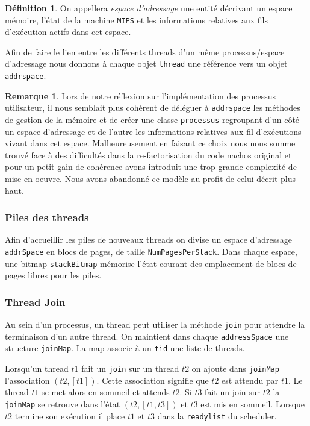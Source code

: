 \documentclass[11pt]{article}
\theoremstyle{definition}
\newtheorem*{myRem}{Remarque}
\theoremstyle{definition}
\newtheorem*{myDef}{Définition}
\begin{document}
\begin{myDef}
  On appellera \textit{espace d'adressage} une entité décrivant un espace mémoire, l'état de la machine \texttt{MIPS} et les informations relatives aux fils d'exécution actifs dans cet espace.
\end{myDef}
Afin de faire le lien entre les différents threads d'un même processus/espace d'adressage nous donnons à chaque objet \texttt{thread} une référence vers un objet \texttt{addrspace}.
\begin{myRem}
Lors de notre réflexion sur l'implémentation des processus utilisateur, il nous semblait plus cohérent de déléguer à \texttt{addrspace} les méthodes de gestion de la mémoire et de créer une classe \texttt{processus} regroupant d'un côté un espace d'adressage et de l'autre les informations relatives aux fil d'exécutions vivant dans cet espace. Malheureusement en faisant ce choix nous nous somme trouvé face à des difficultés dans la re-factorisation du code nachos original et pour un petit gain de cohérence avons introduit une trop grande complexité de mise en oeuvre. Nous avons abandonné ce modèle au profit de celui décrit plus haut.
\end{myRem}

\subsubsection{Piles des threads}
Afin d'accueillir les piles de nouveaux threads on divise un espace d'adressage \texttt{addrSpace} en blocs de pages, de taille \texttt{NumPagesPerStack}.
Dans chaque espace, une bitmap \texttt{stackBitmap} mémorise l'état courant des emplacement de blocs de pages libres pour les piles. 

\subsubsection{Thread Join}
Au sein d'un processus, un thread peut utiliser la méthode \texttt{join} pour attendre la terminaison d'un autre thread.
On maintient dans chaque \texttt{addressSpace} une structure \texttt{joinMap}.
La map associe à un \texttt{tid} une liste de threads.

Lorsqu'un thread $t1$ fait un \texttt{join} sur un thread $t2$ on ajoute dans \texttt{joinMap}
l'association $(t2, [t1])$. Cette association signifie que $t2$ est attendu par $t1$.
Le thread $t1$ se met alors en sommeil et attends $t2$. 
Si $t3$ fait un join sur $t2$ la \texttt{joinMap} se retrouve dans l'état $(t2, [t1,t3])$ et $t3$ est mis en sommeil.
Lorsque $t2$ termine son exécution il place $t1$ et $t3$ dans la \texttt{readylist} du scheduler.
\end{document}
